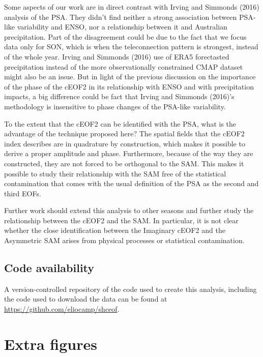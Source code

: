 \documentclass[smallextended]{svjour3}       %
\begin{document}
Some aspects of our work are in direct contrast with Irving and Simmonds (2016) analysis of the PSA.
They didn't find neither a strong association between PSA-like variability and ENSO, nor a relationship between it and Australian precipitation.
Part of the disagreement could be due to the fact that we focus data only for SON, which is when the teleconnection pattern is strongest, instead of the whole year.
Irving and Simmonds (2016) use of ERA5 forectasted precipitation instead of the more observationally constrained CMAP dataset might also be an issue.
But in light of the previous discussion on the importance of the phase of the cEOF2 in its relationship with ENSO and with precipitation impacts, a big difference could be fact that Irving and Simmonds (2016)'s methodology is insensitive to phase changes of the PSA-like variability.

To the extent that the cEOF2 can be identified with the PSA, what is the advantage of the technique proposed here?
The spatial fields that the cEOF2 index describes are in quadrature by construction, which makes it possible to derive a proper amplitude and phase.
Furthermore, because of the way they are constructed, they are not forced to be orthogonal to the SAM.
This makes it possible to study their relationship with the SAM free of the statistical contamination that comes with the usual definition of the PSA as the second and third EOFs.

Further work should extend this analysis to other seasons and further study the relationship between the cEOF2 and the SAM.
In particular, it is not clear whether the close identification between the Imaginary cEOF2 and the Asymmetric SAM arises from physical processes or statistical contamination.

\hypertarget{code-availability}{%
\subsection*{Code availability}\label{code-availability}}

A version-controlled repository of the code used to create this analysis, including the code used to download the data can be found at \url{https://github.com/eliocamp/shceof}.

\appendix


\hypertarget{extra-figures}{%
\section{Extra figures}\label{extra-figures}}
\end{document}
